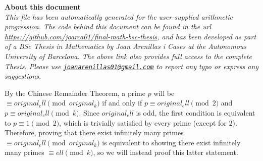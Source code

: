 \begin{mybox}
{\Large \textbf{About this document}}
\vspace{0.3cm}\\
\textit{This file has been automatically generated for the user-supplied arithmetic progression. The code behind this document can be found in the url \url{https://github.com/joarca01/final-math-bsc-thesis}, and has been developed as part of a BSc Thesis in Mathematics by Joan Arenillas i Cases at the Autonomous University of Barcelona. The above link also provides full access to the complete Thesis. Please use \href{mailto:joanarenillas01@gmail.com}{\nolinkurl{joanarenillas01@gmail.com}} to report any typo or express any suggestions.}
\end{mybox}
\vspace{0.5cm}

By the Chinese Remainder Theorem, a prime $p$ will be $\equiv{original_ell}\pmod{{original_k}}$ if and only if $p\equiv{original_ell}\pmod{2}$ and $p\equiv{original_ell}\pmod{{k}}$. Since ${original_ell}$ is odd, the first condition is equivalent to $p\equiv 1\pmod{2}$, which is trivially satisfied by every prime (except for $2$). Therefore, proving that there exist infinitely many primes $\equiv{original_ell}\pmod{{original_k}}$ is equivalent to showing there exist infinitely many primes $\equiv {ell}\pmod{{k}}$, so we will instead proof this latter statement.